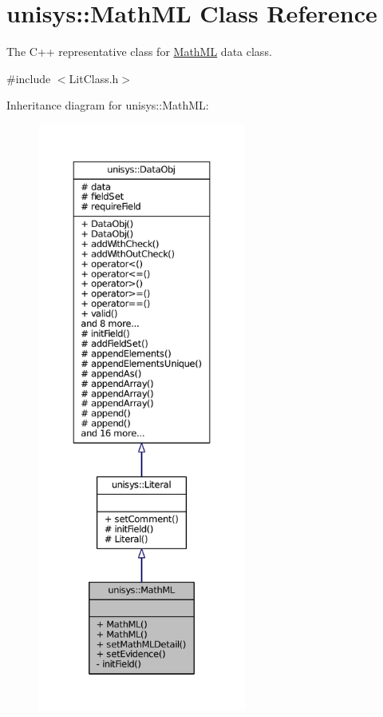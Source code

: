 \hypertarget{classunisys_1_1MathML}{\section{unisys\-:\-:Math\-M\-L Class Reference}
\label{classunisys_1_1MathML}
}


The C++ representative class for \hyperlink{classunisys_1_1MathML}{Math\-M\-L} data class.  




{\ttfamily \#include $<$Lit\-Class.\-h$>$}



Inheritance diagram for unisys\-:\-:Math\-M\-L\-:
\nopagebreak
\begin{figure}[H]
\begin{center}
\leavevmode
\includegraphics[height=550pt]{classunisys_1_1MathML__inherit__graph}
\end{center}
\end{figure}


